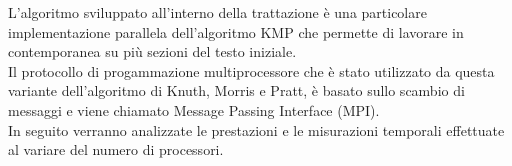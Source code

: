 L'algoritmo sviluppato all'interno della trattazione è una particolare implementazione parallela dell'algoritmo KMP che permette di lavorare in contemporanea su più sezioni del testo iniziale. \\ Il protocollo di progammazione multiprocessore che è stato utilizzato da questa variante dell'algoritmo di Knuth, Morris e Pratt,  è basato sullo scambio di messaggi e viene chiamato Message Passing Interface (MPI).\\
In seguito verranno analizzate le prestazioni e le misurazioni temporali effettuate al variare del numero di processori.\\